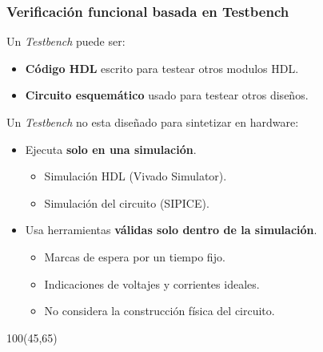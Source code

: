 \documentclass[aspectratio=169]{beamer}
\begin{document}
\begin{frame}[fragile,t]
    \frametitle{Verificación funcional basada en Testbench}
    \textcolor{verdeuca}{Un \emph{Testbench} puede ser:}
    \begin{itemize}
    \item \textbf{Código HDL} escrito para testear otros modulos HDL.
    \item \textbf{Circuito esquemático} usado para testear otros diseños.
    \end{itemize}
    \pause
    \textcolor{verdeuca}{Un \emph{Testbench} no esta diseñado para sintetizar en hardware:}
    \begin{itemize}
    \item<3-> Ejecuta \textbf{solo en una simulación}.
    \begin{itemize}
    \item Simulación HDL (Vivado Simulator).
    \item Simulación del circuito (SIPICE).
    \end{itemize}
    \item<4-> Usa herramientas \textbf{válidas solo dentro de la simulación}.
    \begin{itemize}
    \item Marcas de espera por un tiempo fijo.
    \item Indicaciones de voltajes y corrientes ideales.
    \item No considera la construcción física del circuito.
    \end{itemize}
    \end{itemize}
    \bigskip
    \vspace{5cm}
    \begin{textblock}{100}(45,65)
    \end{textblock}
\end{frame}
\end{document}

